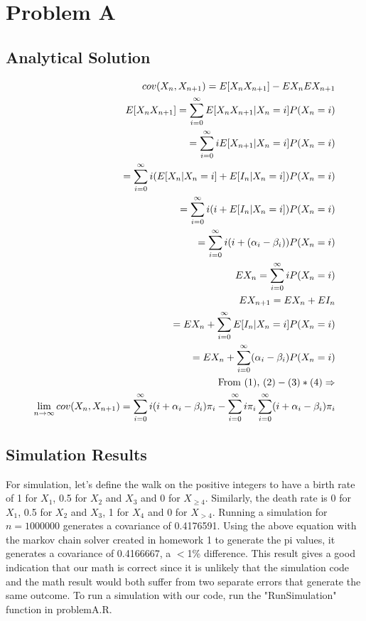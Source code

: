 \documentclass{article}
\begin{document}
\section{Problem A}
\subsection{Analytical Solution}
\begin{align}
cov(X_n,X_{n+1})=E[X_nX_{n+1}]-EX_nEX_{n+1} \\
E[X_nX_{n+1}]=\sum_{i=0}^{\infty}E[X_nX_{n+1}|X_n=i]P(X_n=i) \\
=\sum_{i=0}^{\infty}iE[X_{n+1}|X_n=i]P(X_n=i) \notag\\
=\sum_{i=0}^{\infty}i(E[X_n|X_n=i]+E[I_n|X_n=i])P(X_n=i) \notag\\
=\sum_{i=0}^{\infty}i(i+E[I_n|X_n=i])P(X_n=i) \notag\\
=\sum_{i=0}^{\infty}i(i+(\alpha_i-\beta_i))P(X_n=i) \notag\\
EX_n=\sum_{i=0}^{\infty}iP(X_n=i) \\
EX_{n+1}=EX_n+EI_n \\
=EX_n+\sum_{i=0}^{\infty}E[I_n|X_n=i]P(X_n=i) \notag\\
=EX_n+\sum_{i=0}^{\infty}(\alpha_i-\beta_i)P(X_n=i) \notag\\
\text{From (1), }(2)-(3)*(4)\Rightarrow \notag\\
\lim_{n\rightarrow\infty}cov(X_n,X_{n+1})=\sum_{i=0}^{\infty}i(i+\alpha_i-\beta_i)\pi_i-\sum_{i=0}^{\infty}i\pi_i\sum_{i=0}^{\infty}(i+\alpha_i-\beta_i)\pi_i
\end{align}
\subsection{Simulation Results}

For simulation, let's define the walk on the positive integers to have a birth rate of 1 for $X_1$, 0.5 for $X_2$ and $X_3$ and 0 for $X_{\geq4}$. Similarly, the death rate is 0 for $X_1$, 0.5 for $X_2$ and $X_3$, 1 for $X_4$ and 0 for $X_{>4}$. Running a simulation for $n = 1000000$ generates a covariance of 0.4176591. Using the above equation with the markov chain solver created in homework 1 to generate the pi values, it generates a covariance of 0.4166667, a $<$1\% difference. This result gives a good indication that our math is correct since it is unlikely that the simulation code and the math result would both suffer from two separate errors that generate the same outcome. To run a simulation with our code, run the "RunSimulation" function in problemA.R.
\end{document}
